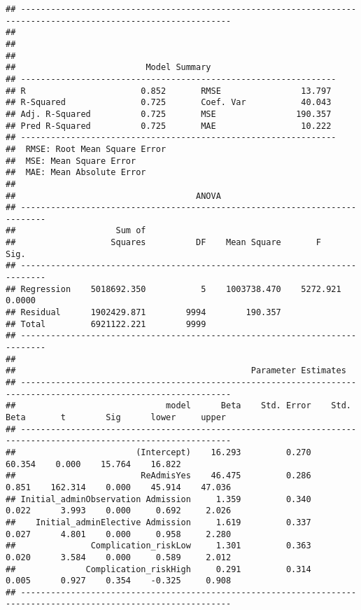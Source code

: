 \documentclass[
]{article}
\begin{document}
\begin{verbatim}
## ----------------------------------------------------------------------------------------------------------------
## 
## 
## 
##                          Model Summary                          
## ---------------------------------------------------------------
## R                       0.852       RMSE                13.797 
## R-Squared               0.725       Coef. Var           40.043 
## Adj. R-Squared          0.725       MSE                190.357 
## Pred R-Squared          0.725       MAE                 10.222 
## ---------------------------------------------------------------
##  RMSE: Root Mean Square Error 
##  MSE: Mean Square Error 
##  MAE: Mean Absolute Error 
## 
##                                    ANOVA                                    
## ---------------------------------------------------------------------------
##                    Sum of                                                  
##                   Squares          DF    Mean Square       F          Sig. 
## ---------------------------------------------------------------------------
## Regression    5018692.350           5    1003738.470    5272.921    0.0000 
## Residual      1902429.871        9994        190.357                       
## Total         6921122.221        9999                                      
## ---------------------------------------------------------------------------
## 
##                                               Parameter Estimates                                                
## ----------------------------------------------------------------------------------------------------------------
##                              model      Beta    Std. Error    Std. Beta       t        Sig      lower     upper 
## ----------------------------------------------------------------------------------------------------------------
##                        (Intercept)    16.293         0.270                  60.354    0.000    15.764    16.822 
##                         ReAdmisYes    46.475         0.286        0.851    162.314    0.000    45.914    47.036 
## Initial_adminObservation Admission     1.359         0.340        0.022      3.993    0.000     0.692     2.026 
##    Initial_adminElective Admission     1.619         0.337        0.027      4.801    0.000     0.958     2.280 
##               Complication_riskLow     1.301         0.363        0.020      3.584    0.000     0.589     2.012 
##              Complication_riskHigh     0.291         0.314        0.005      0.927    0.354    -0.325     0.908 
## ----------------------------------------------------------------------------------------------------------------

\end{verbatim}
\end{document}
